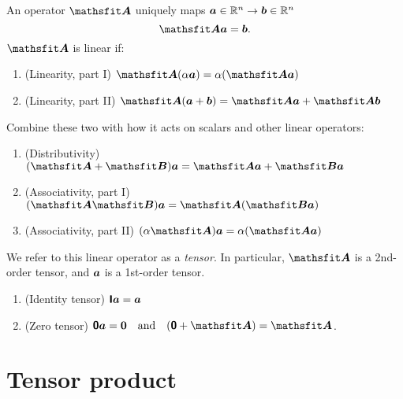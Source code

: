 An operator \(\mbt{A}\) uniquely maps \(\bm{a} \in \mathbb{R}^n \rightarrow \bm{b} \in \mathbb{R}^n\)
%
\begin{equation}
  \mbt{A} \mb{a} = \mb{b}.
\end{equation}
%
\(\mbt{A}\) is linear if:
%
\begin{enumerate}
  \item (Linearity, part I)  \hspace{2ex} \(\mbt{A}(\alpha \mb{a}) = \alpha (\mbt{A} \mb{a})\)
  \item (Linearity, part II) \hspace{2ex} \(\mbt{A}(\mb{a} + \mb{b}) = \mbt{A} \mb{a} + \mbt{A} \mb{b}\)
\end{enumerate}
%
Combine these two with how it acts on scalars and other linear operators:
%
\begin{enumerate}[start=3]
  \item (Distributivity) \hspace{2ex} \((\mbt{A} + \mbt{B}) \mb{a} = \mbt{A} \mb{a} + \mbt{B} \mb{a}\)
  \item (Associativity, part I)  \hspace{2ex} \((\mbt{A} \mbt{B}) \mb{a} = \mbt{A} (\mbt{B} \mb{a})\)
  \item (Associativity, part II) \hspace{2ex} \((\alpha \mbt{A}) \mb{a} = \alpha (\mbt{A} \mb{a})\)
\end{enumerate}
%
We refer to this linear operator as a \emph{tensor}.
In particular, \(\mbt{A}\) is a 2nd-order tensor, and \(\bm{a}\) is a 1st-order tensor.
%
\begin{enumerate}[start=6]
  \item (Identity tensor) \hspace{2ex} \(\bm{\mathsf I} \bm{a} = \bm{a}\)
  \item (Zero tensor) \hspace{2ex} \(\zerotensor \mb{a} = \bm{0} \quad \text{and} \quad (\zerotensor + \mbt{A}) = \mbt{A}\).
\end{enumerate}


\section{Tensor product}


